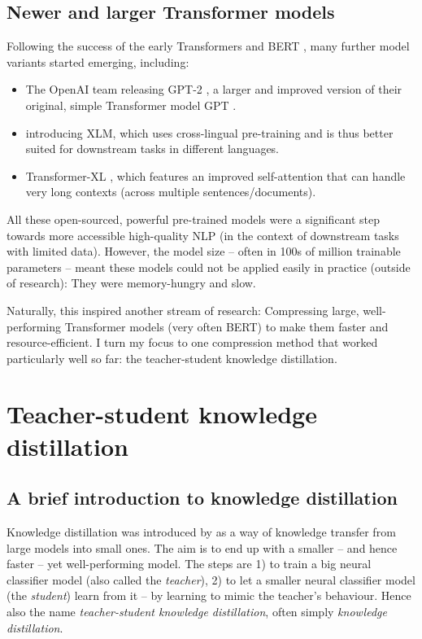 \documentclass[bsc,frontabs,twoside,singlespacing,parskip,deptreport]{infthesis}
\begin{document}
{{    \subsection{Newer and larger Transformer models}{
      \label{sec:post-BERT-models}
      Following the success of the early Transformers and BERT \citep{Vaswani_2017,Radford_2018,Devlin_2018}, many further model variants started emerging, including:
      \begin{itemize}
        \item The OpenAI team releasing GPT-2 \citep{Radford_2019}, a larger and improved version of their original, simple Transformer model GPT \citep{Radford_2018}.
        \item \citet{Lample_2019} introducing XLM, which uses cross-lingual pre-training and is thus better suited for downstream tasks in different languages.
        \item Transformer-XL \citep{Dai_2019}, which features an improved self-attention that can handle very long contexts (across multiple sentences/documents).
      \end{itemize}

      All these open-sourced, powerful pre-trained models were a significant step towards more accessible high-quality NLP (in the context of downstream tasks with limited data). However, the model size -- often in 100s of million trainable parameters -- meant these models could not be applied easily in practice (outside of research): They were memory-hungry and slow.
      
      Naturally, this inspired another stream of research: Compressing large, well-performing Transformer models (very often BERT) to make them faster and resource-efficient.
      I turn my focus to one compression method that worked particularly well so far: the teacher-student knowledge distillation.
    }
  }

  \section{Teacher-student knowledge distillation}{
    \label{sec:KD}
    \subsection{A brief introduction to knowledge distillation}{
      \label{sec:KD-intro}
      Knowledge distillation was introduced by \citep{Bucila_2006} as a way of knowledge transfer from large models into small ones. The aim is to end up with a smaller -- and hence faster -- yet well-performing model. The steps are 1) to train a big neural classifier model (also called the \textit{teacher}), 2) to let a smaller neural classifier model (the \textit{student}) learn from it -- by learning to mimic the teacher's behaviour. Hence also the name \textit{teacher-student knowledge distillation}, often simply \textit{knowledge distillation}.
      
}}}
\end{document}
